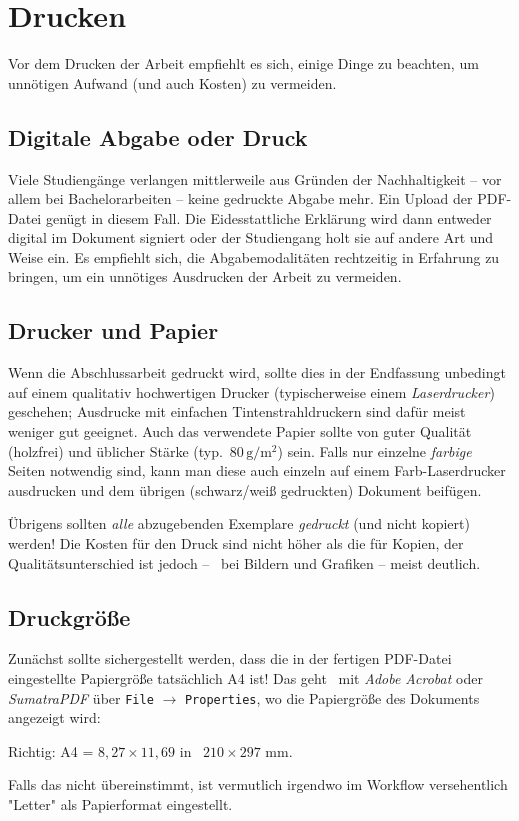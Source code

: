 \section{Drucken}

Vor dem Drucken der Arbeit empfiehlt es sich, einige Dinge zu beachten, um
unnötigen Aufwand (und auch Kosten) zu vermeiden.

\subsection{Digitale Abgabe oder Druck}

Viele Studiengänge verlangen mittlerweile aus Gründen der Nachhaltigkeit -- vor
allem bei Bachelorarbeiten -- keine gedruckte Abgabe mehr. Ein Upload der
PDF-Datei genügt in diesem Fall. Die Eidesstattliche Erklärung wird dann
entweder digital im Dokument signiert oder der Studiengang holt sie auf andere
Art und Weise ein. Es empfiehlt sich, die Abgabemodalitäten rechtzeitig in Erfahrung zu
bringen, um ein unnötiges Ausdrucken der Arbeit zu vermeiden.

\subsection{Drucker und Papier}

Wenn die Abschlussarbeit gedruckt wird, sollte dies in der Endfassung unbedingt
auf einem qualitativ hochwertigen Drucker (typischerweise einem
\emph{Laserdrucker}) geschehen; Ausdrucke mit einfachen Tintenstrahldruckern
sind dafür meist weniger gut geeignet. Auch das verwendete
Papier sollte von guter Qualität (holzfrei) und üblicher Stärke (typ.\  
$80\,\mathrm{g} / \mathrm{m}^2$) sein. Falls nur einzelne \emph{farbige} Seiten 
notwendig sind, kann man diese auch einzeln auf einem Farb-Laserdrucker ausdrucken
und dem übrigen (schwarz/weiß gedruckten) Dokument beifügen.

Übrigens sollten \emph{alle} abzugebenden Exemplare \emph{gedruckt} (und
nicht kopiert) werden! Die Kosten für den Druck sind nicht höher als die für
Kopien, der Qualitätsunterschied ist jedoch -- \va\ bei Bildern und Grafiken
-- meist deutlich.

\subsection{Druckgröße}

Zunächst sollte sichergestellt werden, dass die in der fertigen PDF-Datei
eingestellte Papiergröße tatsächlich \textrm{A4} ist! Das geht \zB\ mit
\emph{Adobe Acrobat} oder \emph{SumatraPDF} über \texttt{File} $\rightarrow$
\texttt{Properties}, wo die Papiergröße des Dokuments angezeigt wird:
\begin{center}
	\textrm{Richtig:} A4 = $8{,}27 \times 11{,}69$ in \bzw\ $210 \times 297$ mm.
\end{center}
Falls das nicht übereinstimmt, ist vermutlich irgendwo im Workflow versehentlich
"Letter" als Papierformat eingestellt.


